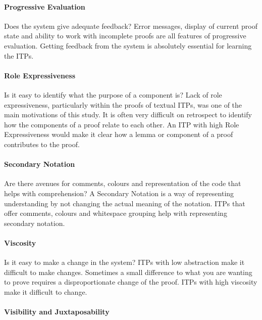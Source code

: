 \documentclass[
]{article}
\begin{document}
\hypertarget{progressive-evaluation}{%
\paragraph{Progressive Evaluation}\label{progressive-evaluation}}

Does the system give adequate feedback? Error messages, display of
current proof state and ability to work with incomplete proofs are all
features of progressive evaluation. Getting feedback from the system is
absolutely essential for learning the ITPs.

\hypertarget{role-expressiveness}{%
\paragraph{Role Expressiveness}\label{role-expressiveness}}

Is it easy to identify what the purpose of a component is? Lack of role
expressiveness, particularly within the proofs of textual ITPs, was one
of the main motivations of this study. It is often very difficult on
retrospect to identify how the components of a proof relate to each
other. An ITP with high Role Expressiveness would make it clear how a
lemma or component of a proof contributes to the proof.

\hypertarget{secondary-notation}{%
\paragraph{Secondary Notation}\label{secondary-notation}}

Are there avenues for comments, colours and representation of the code
that helps with comprehension? A Secondary Notation is a way of
representing understanding by not changing the actual meaning of the
notation. ITPs that offer comments, colours and whitespace grouping help
with representing secondary notation.

\hypertarget{viscosity}{%
\paragraph{Viscosity}\label{viscosity}}

Is it easy to make a change in the system? ITPs with low abstraction
make it difficult to make changes. Sometimes a small difference to what
you are wanting to prove requires a disproportionate change of the
proof. ITPs with high viscosity make it difficult to change.

\hypertarget{visibility-and-juxtaposability}{%
\paragraph{Visibility and
Juxtaposability}\label{visibility-and-juxtaposability}}
\end{document}
